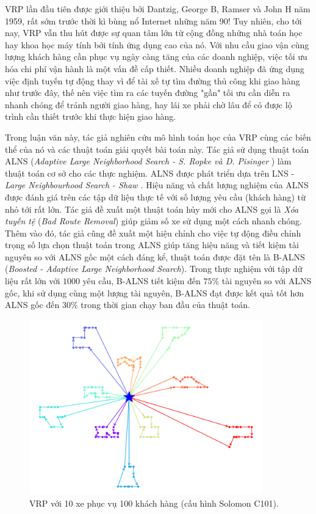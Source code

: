 VRP lần đầu tiên được giới thiệu bởi Dantzig, George B, Ramser và John H \cite{dantzig1959truck} năm 1959, rất sớm trước thời kì bùng nổ Internet những năm 90! Tuy nhiên, cho tới nay, VRP vẫn thu hút được sự quan tâm lớn từ cộng đồng những nhà toán học hay khoa học máy tính bởi tính ứng dụng cao của nó. Với nhu cầu giao vận cùng lượng khách hàng cần phục vụ ngày càng tăng của các doanh nghiệp, việc tối ưu hóa chi phí vận hành là một vấn đề cấp thiết. Nhiều doanh nghiệp đã ứng dụng việc định tuyến tự động thay vì để tài xế tự tìm đường thủ công khi giao hàng như trước đây, thế nên việc tìm ra các tuyến đường "gần" tối ưu cần diễn ra nhanh chóng để tránh người giao hàng, hay lái xe phải chờ lâu để có được lộ trình cần thiết trước khi thực hiện giao hàng. 

Trong luận văn này, tác giả nghiên cứu mô hình toán học của VRP cùng các biến thể của nó và các thuật toán giải quyết bài toán này. Tác giả sử dụng thuật toán ALNS (\textit{Adaptive Large Neighborhood Search - S. Ropke và D. Pisinger} \cite{ropke2006adaptive}) làm thuật toán cơ sở cho các thực nghiệm. ALNS được phát triển dựa trên LNS - \textit{Large Neighbourhood Search - Shaw \cite{shaw1997new} \cite{shaw1998using}}. Hiệu năng và chất lượng nghiệm của ALNS được đánh giá trên các tập dữ liệu thực tế với số lượng yêu cầu (khách hàng) từ nhỏ tới rất lớn. Tác giả đề xuất một thuật toán hủy mới cho ALNS gọi là \textit{Xóa tuyến tệ} (\textit{Bad Route Removal}) giúp giảm số xe sử dụng một cách nhanh chóng. Thêm vào đó, tác giả cũng đề xuất một hiệu chỉnh cho việc tự động điều chỉnh trọng số lựa chọn thuật toán trong ALNS giúp tăng hiệu năng và tiết kiệm tài nguyên so với ALNS gốc một cách đáng kể, thuật toán được đặt tên là B-ALNS (\textit{Boosted - Adaptive Large Neighborhood Search}). Trong thực nghiệm với tập dữ liệu rất lớn với $1000$ yêu cầu, B-ALNS tiết kiệm đến $75\%$ tài nguyên so với ALNS gốc, khi sử dụng cùng một lượng tài nguyên, B-ALNS đạt được kết quả tốt hơn ALNS gốc đến $30\%$ trong thời gian chạy ban đầu của thuật toán.

\begin{figure}[H] %
  \centering %
  \includegraphics[width=0.9\textwidth]{figures/routes_c101.png} 
  \caption{VRP với 10 xe phục vụ 100 khách hàng (cấu hình Solomon C101).} 
\end{figure}

